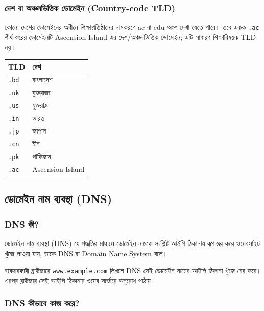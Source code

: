 \subsubsection{দেশ বা অঞ্চলভিত্তিক ডোমেইন (Country-code TLD)}

কোনো দেশের ডোমেইনের অধীনে শিক্ষাপ্রতিষ্ঠানের নামকরণে ac বা edu অংশ দেখা যেতে পারে। তবে একক \texttt{.ac} শীর্ষ স্তরের ডোমেইনটি Ascension Island-এর দেশ/অঞ্চলভিত্তিক ডোমেইন; এটি সাধারণ শিক্ষাবিষয়ক TLD নয়।

\begin{center}
\begin{tabular}{|p{}|p{}|}
\hline
\textbf{TLD} & \textbf{দেশ} \\
\hline
\texttt{.bd} & বাংলাদেশ \\
\hline
\texttt{.uk} & যুক্তরাজ্য \\
\hline
\texttt{.us} & যুক্তরাষ্ট্র \\
\hline
\texttt{.in} & ভারত \\
\hline
\texttt{.jp} & জাপান \\
\hline
\texttt{.cn} & চীন \\
\hline
\texttt{.pk} & পাকিস্তান \\
\hline
\texttt{.ac} & Ascension Island \\
\hline
\end{tabular}
\end{center}

\subsection{ডোমেইন নাম ব্যবস্থা (DNS)}

\subsubsection{DNS কী?}

\begin{definitionbox}{ডোমেইন নাম ব্যবস্থা (DNS)}
যে পদ্ধতির মাধ্যমে ডোমেইন নামকে সংশ্লিষ্ট আইপি ঠিকানায় রূপান্তর করে ওয়েবসাইট খুঁজে পাওয়া যায়, তাকে DNS বা Domain Name System বলে।
\end{definitionbox}

ব্যবহারকারী ব্রাউজারে \texttt{www.example.com} লিখলে DNS সেই ডোমেইন নামের আইপি ঠিকানা খুঁজে বের করে। এরপর ব্রাউজার সেই আইপি ঠিকানার ওয়েব সার্ভারে অনুরোধ পাঠায়।

\subsubsection{DNS কীভাবে কাজ করে?}

